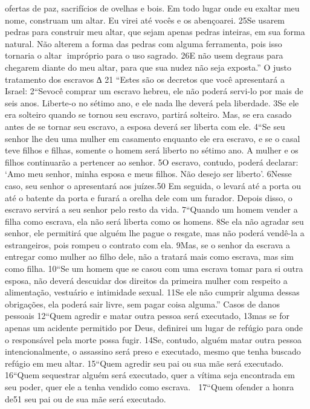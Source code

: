 ofertas de paz, sacrifícios de ovelhas e bois. Em todo lugar onde eu exaltar meu
nome, construam um altar. Eu virei até vocês e os abençoarei. 25Se usarem pedras
para construir meu altar, que sejam apenas pedras inteiras, em sua forma natural.
Não alterem a forma das pedras com alguma ferramenta, pois isso tornaria o altar
impróprio para o uso sagrado. 26E não usem degraus para chegarem diante do
meu altar, para que sua nudez não seja exposta.”
O justo tratamento dos escravos
∆   21 “Estes são os decretos que você apresentará a Israel:
    2“Sevocê comprar um escravo hebreu, ele não poderá servi-lo por mais de seis
anos. Liberte-o no sétimo ano, e ele nada lhe deverá pela liberdade. 3Se ele era
solteiro quando se tornou seu escravo, partirá solteiro. Mas, se era casado antes de
se tornar seu escravo, a esposa deverá ser liberta com ele.
   4“Se seu senhor lhe deu uma mulher em casamento enquanto ele era escravo, e
se o casal teve filhos e filhas, somente o homem será liberto no sétimo ano. A
mulher e os filhos continuarão a pertencer ao senhor. 5O escravo, contudo,
poderá declarar: ‘Amo meu senhor, minha esposa e meus filhos. Não desejo ser
liberto’. 6Nesse caso, seu senhor o apresentará aos juízes.50 Em seguida, o levará
até a porta ou até o batente da porta e furará a orelha dele com um furador.
Depois disso, o escravo servirá a seu senhor pelo resto da vida.
   7“Quando um homem vender a filha como escrava, ela não será liberta como os
homens. 8Se ela não agradar seu senhor, ele permitirá que alguém lhe pague o
resgate, mas não poderá vendê-la a estrangeiros, pois rompeu o contrato com ela.
9Mas, se o senhor da escrava a entregar como mulher ao filho dele, não a tratará
mais como escrava, mas sim como filha.
   10“Se um homem que se casou com uma escrava tomar para si outra esposa,
não deverá descuidar dos direitos da primeira mulher com respeito a
alimentação, vestuário e intimidade sexual. 11Se ele não cumprir alguma dessas
obrigações, ela poderá sair livre, sem pagar coisa alguma.”
Casos de danos pessoais
12“Quem agredir e matar outra pessoa será executado, 13mas se for apenas um
acidente permitido por Deus, definirei um lugar de refúgio para onde o
responsável pela morte possa fugir. 14Se, contudo, alguém matar outra pessoa
intencionalmente, o assassino será preso e executado, mesmo que tenha buscado
refúgio em meu altar.
   15“Quem agredir seu pai ou sua mãe será executado.
   16“Quem sequestrar alguém será executado, quer a vítima seja encontrada em
seu poder, quer ele a tenha vendido como escrava.
  17“Quem ofender a honra de51 seu pai ou de sua mãe será executado.
